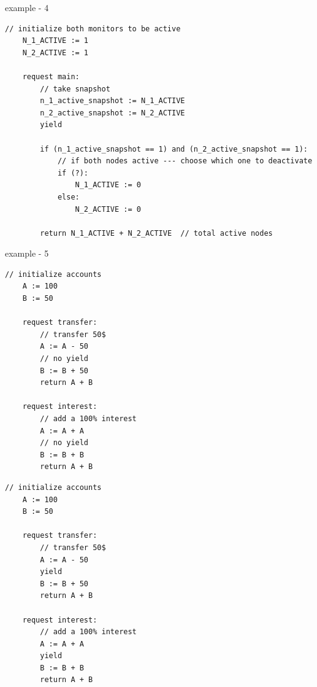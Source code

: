 example - 4

\begin{minipage}[t]{1.0\textwidth}
\begin{lstlisting}[caption={Snapshot-based monitor deactivation (not serializable, as it can return a sume of 0 active monitors)}]
	// initialize both monitors to be active
    N_1_ACTIVE := 1
    N_2_ACTIVE := 1
	
    request main:
        // take snapshot
        n_1_active_snapshot := N_1_ACTIVE
        n_2_active_snapshot := N_2_ACTIVE
        yield
		
        if (n_1_active_snapshot == 1) and (n_2_active_snapshot == 1):
            // if both nodes active --- choose which one to deactivate 
            if (?): 
                N_1_ACTIVE := 0
            else:
                N_2_ACTIVE := 0

        return N_1_ACTIVE + N_2_ACTIVE  // total active nodes
\end{lstlisting}
\end{minipage}
	

\newpage

example - 5

\noindent
\begin{minipage}[t]{0.45\textwidth}
	\begin{lstlisting}[caption={bank (serializable)}]
    // initialize accounts
    A := 100
    B := 50
    
    request transfer: 
        // transfer 50$
        A := A - 50
        // no yield
        B := B + 50
        return A + B
			
    request interest: 
        // add a 100% interest
        A := A + A
        // no yield
        B := B + B
        return A + B	      		        
		\end{lstlisting}
\end{minipage}
\hfill
\begin{minipage}[t]{0.45\textwidth}
	\begin{lstlisting}[caption={bank with yields (non serializable)}]
    // initialize accounts
    A := 100
    B := 50
		
    request transfer: 
        // transfer 50$
        A := A - 50
        yield
        B := B + 50
        return A + B

    request interest: 
        // add a 100% interest
        A := A + A
        yield
        B := B + B
        return A + B	      		        
	\end{lstlisting}
\end{minipage}
	
